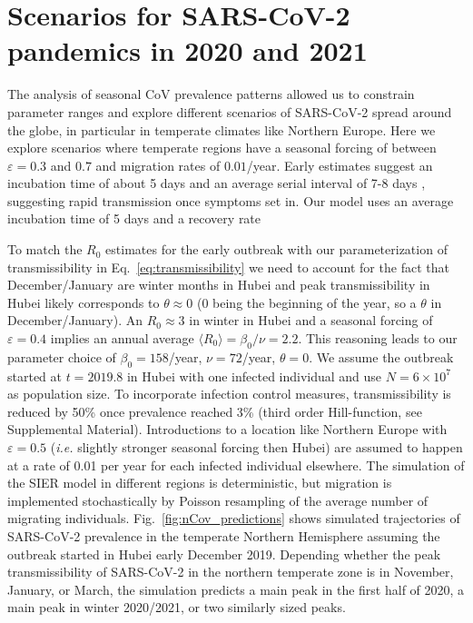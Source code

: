 \documentclass[rmp, reprint, superscriptaddress, floatfix,amsmath]{revtex4-1}
\newcommand{\forcing}{\varepsilon}
\begin{document}
\section{Scenarios for SARS-CoV-2 pandemics in 2020 and 2021}
\label{section:sars_pandemic_regional}
The analysis of seasonal CoV prevalence patterns allowed us to constrain parameter ranges and explore different scenarios of SARS-CoV-2 spread around the globe, in particular in temperate climates like Northern Europe. 
Here we explore scenarios where temperate regions have a seasonal forcing of between $\forcing=0.3$ and $0.7$ and migration rates of $0.01$/year. 
Early estimates suggest an incubation time of about 5 days  and an average serial interval of 7-8 days \citep{wu_nowcasting_2020}, suggesting rapid transmission once symptoms set in. 
Our model uses an average incubation time of 5 days \citep{backer_incubation_2020} and a recovery rate  

To match the $R_0$ estimates for the early outbreak with our parameterization of transmissibility in Eq.~\ref{eq:transmissibility} we need to account for the fact that December/January are winter months in Hubei and peak transmissibility in Hubei likely corresponds to $\theta\approx 0$ (0 being the beginning of the year, so a $\theta$ in December/January). An $R_0\approx 3$ in winter in Hubei and a seasonal forcing of $\forcing=0.4$ implies an annual average $\langle R_0\rangle = \beta_0/\nu=2.2$.
This reasoning leads to our parameter choice of $\beta_0=158$/year, $\nu=72$/year, $\theta=0$. 
We assume the outbreak started at $t=2019.8$ in Hubei with one infected individual and use $N=6\times 10^{7}$ as population size.
To incorporate infection control measures, transmissibility is reduced by 50\% once prevalence reached 3\% (third order Hill-function, see Supplemental Material).
Introductions to a location like Northern Europe with $\forcing=0.5$ (\textit{i.e.} slightly stronger seasonal forcing then Hubei) are assumed to happen at a rate of 0.01 per year for each infected individual elsewhere.
The simulation of the SIER model in different regions is deterministic, but migration is implemented stochastically by Poisson resampling of the average number of migrating individuals. 
Fig.~\ref{fig:nCov_predictions} shows simulated trajectories of SARS-CoV-2 prevalence in the temperate Northern Hemisphere assuming the outbreak started in Hubei early December 2019.
Depending whether the peak transmissibility of SARS-CoV-2 in the northern temperate zone is in November, January, or March, the simulation predicts a main peak in the first half of 2020, a main peak in winter 2020/2021, or two similarly sized peaks.
\end{document}
